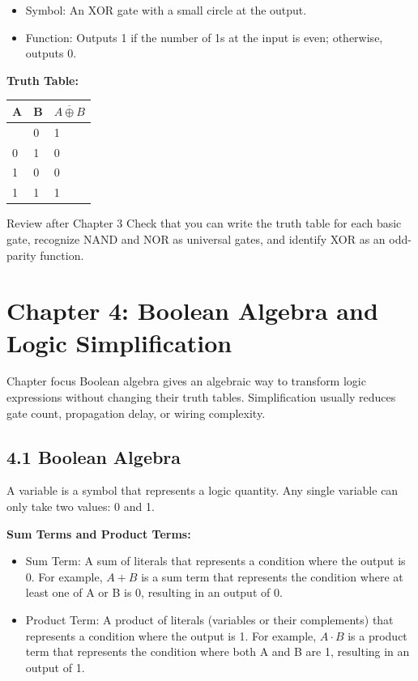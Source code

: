 \documentclass[11pt,a4paper]{article}
\providecommand{\tightlist}{\setlength{\itemsep}{1pt}\setlength{\parskip}{0pt}}
\begin{document}
\begin{itemize}
\tightlist
\item
  Symbol: An XOR gate with a small circle at the output.
\item
  Function: Outputs 1 if the number of 1s at the input is even;
  otherwise, outputs 0.
\end{itemize}

\textbf{Truth Table:}

\begin{longtable}[]{@{}lll@{}}
\toprule\noalign{}
A & B & \(\overline{A \oplus B}\) \\
\midrule\noalign{}
\endhead
\bottomrule\noalign{}
\endlastfoot
0 & 0 & 1 \\
0 & 1 & 0 \\
1 & 0 & 0 \\
1 & 1 & 1 \\
\end{longtable}

\begin{notebox}{Review after Chapter 3}
Check that you can write the truth table for each basic gate, recognize NAND and NOR as universal gates, and identify XOR as an odd-parity function.
\end{notebox}

\section{Chapter 4: Boolean Algebra and Logic
Simplification}\label{chapter-4-boolean-algebra-and-logic-simplification}

\begin{chapterbox}{Chapter focus}
Boolean algebra gives an algebraic way to transform logic expressions without changing their truth tables. Simplification usually reduces gate count, propagation delay, or wiring complexity.
\end{chapterbox}

\subsection{4.1 Boolean Algebra}\label{boolean-algebra}

A variable is a symbol that represents a logic quantity. Any single
variable can only take two values: 0 and 1.

\textbf{Sum Terms and Product Terms:}

\begin{itemize}
\tightlist
\item
  Sum Term: A sum of literals that represents a condition where the
  output is 0. For example, \(A + B\) is a sum term that represents the
  condition where at least one of A or B is 0, resulting in an output of
  0.
\item
  Product Term: A product of literals (variables or their complements)
  that represents a condition where the output is 1. For example,
  \(A \cdot B\) is a product term that represents the condition where
  both A and B are 1, resulting in an output of 1.
\end{itemize}
\end{document}
